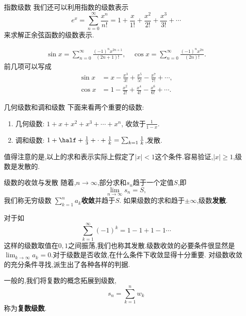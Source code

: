 \documentclass[fontset=windows, chinese, 10pt]{beamer}
\begin{document}
  \begin{frame}{指数级数}
  \small
我们还可以利用指数的级数表示
\begin{equation}
    e^{x} = \sum_{n=0}^{\infty} \frac{x^n}{n!} = 1 + \frac{x}{1!} + \frac{x^2}{2!} + \frac{x^3}{3!} + \cdots 
\end{equation}
来求解正余弦函数的级数表示.

\begin{align*}
  \sin x = \sum_{n=0}^{\infty} \frac{(-1)^n x^{2n+1}}{(2n+1)!}, \quad
  \cos x = \sum_{n=0}^{\infty} \frac{(-1)^n x^{2n}}{(2n)!} .
\end{align*}
前几项可以写成
\begin{align*}
  \sin x & = x - \frac{x^3}{3!} + \frac{x^5}{5!} - \frac{x^7}{7!} + \cdots , \\
  \cos x & = 1 - \frac{x^2}{2!} + \frac{x^4}{4!} - \frac{x^6}{6!} + \cdots .
\end{align*}
\end{frame}


\begin{frame}{几何级数和调和级数}
\small
下面来看两个重要的级数:
\begin{enumerate}
    \item 几何级数: $ 1 + x + x^2 + x^3 + \cdots + x^n$, 收敛于$\frac{1}{1-x}$.
    \item 调和级数: $ 1 + \half + \frac{1}{3} + \cdot +\frac{1}{k} = \sum_{k=1} \frac{1}{k}$,发散.
\end{enumerate}

值得注意的是,以上的求和表示实际上假定了$|x|<1$这个条件.容易验证,$|x|\geq 1$,级数是发散的.


\end{frame}


\begin{frame}{级数的收敛与发散}
  \small
 随着,$n\to \infty$,部分求和$s_n$趋于一个定值$S$,即
\begin{equation}
    \lim_{n\to \infty} s_n = S ,
\end{equation}
我们称无穷级数 $\sum_{k=1}^{n} a_{k}${\bf 收敛}并趋于$S$.
如果级数的求和趋于$\pm \infty$,级数{\bf 发散}.

对于如
\begin{equation}
    \sum_{k=1}^{\infty} (-1)^k = 1 - 1 + 1 - 1 \cdots 
\end{equation}
这样的级数取值在$0,1$之间振荡,我们也称其发散.级数收敛的必要条件很显然是$\lim_{k\to \infty} a_k = 0$.对于级数是否收敛,在什么条件下收敛显得十分重要.
对级数收敛的充分条件寻找,派生出了各种各样的判据.

一般的,我们将复数的概念拓展到级数,
\begin{equation}
    s_n = \sum_{k=1}^{n} w_{k}
\end{equation}
称为\textbf{复数级数}.
  \end{frame}
\end{document}
